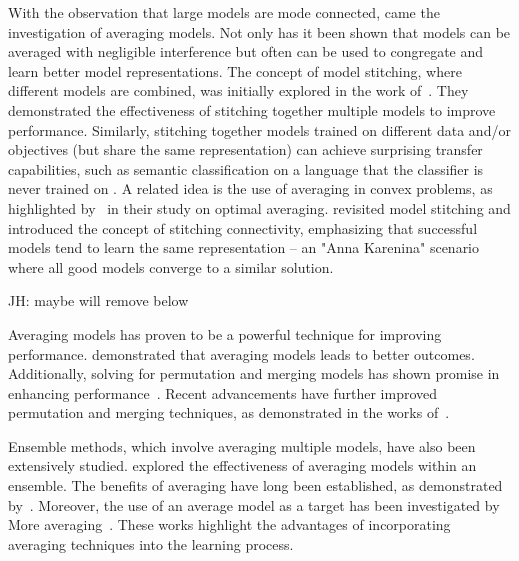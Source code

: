 \documentclass{article}
\newcommand{\jh}[1]{{\;\color{red}JH: #1}}
\theoremstyle{plain}
\theoremstyle{definition}
\theoremstyle{remark}
\begin{document}
With the observation that large models are mode connected, came the investigation of averaging models. Not only has it been shown that models can be averaged with negligible interference but often can be used to congregate and learn better model representations.
The concept of model stitching, where different models are combined, was initially explored in the work of~\cite{lenc2015understanding}. They demonstrated the effectiveness of stitching together multiple models to improve performance. Similarly, stitching together models trained on different data and/or objectives (but share the same representation) can achieve surprising transfer capabilities, such as semantic classification on a language that the classifier is never trained on \citep{moschella2022relative}.
A related idea is the use of averaging in convex problems, as highlighted by ~\cite{scaman2019optimal}in their study on optimal averaging. 
\cite{bansal2021revisiting} revisited model stitching and introduced the concept of stitching connectivity, emphasizing that successful models tend to learn the same representation -- an "Anna Karenina" scenario where all good models converge to a similar solution.

\jh{maybe will remove below}

Averaging models has proven to be a powerful technique for improving performance. \cite{wortsman2022model} demonstrated that averaging models leads to better outcomes. Additionally, solving for permutation and merging models has shown promise in enhancing performance~\cite{ainsworth2022git}.
 Recent advancements have further improved permutation and merging techniques, as demonstrated in the works of~\cite{stoica2023zipit,jordan2022repair}.
 
Ensemble methods, which involve averaging multiple models, have also been extensively studied. \cite{huang2017snapshot,izmailov2018averaging} explored the effectiveness of averaging models within an ensemble. The benefits of averaging have long been established, as demonstrated by~\cite{polyak1992acceleration}.
Moreover, the use of an average model as a target has been investigated by~\cite{tarvainen2017mean,cai2021exponential,grill2020bootstrap}
More averaging~\cite{jolicoeur2023population,wortsman2022fi}. These works highlight the advantages of incorporating averaging techniques into the learning process.\\
\end{document}
